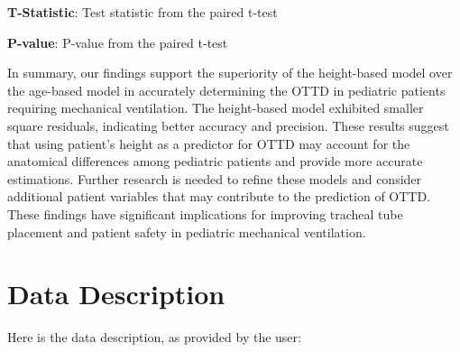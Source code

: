 \documentclass[11pt]{article}
\begin{document}
\begin{table}[h]
\caption{Paired t-test results for residuals of the Height and Age Models}
\label{table:t_test}
\begin{threeparttable}
\renewcommand{\TPTminimum}{\linewidth}
\begin{tablenotes}
\footnotesize
\item \textbf{T-Statistic}: Test statistic from the paired t-test
\item \textbf{P-value}: P-value from the paired t-test
\end{tablenotes}
\end{threeparttable}
\end{table}


In summary, our findings support the superiority of the height-based model over the age-based model in accurately determining the OTTD in pediatric patients requiring mechanical ventilation. The height-based model exhibited smaller square residuals, indicating better accuracy and precision. These results suggest that using patient's height as a predictor for OTTD may account for the anatomical differences among pediatric patients and provide more accurate estimations. Further research is needed to refine these models and consider additional patient variables that may contribute to the prediction of OTTD. These findings have significant implications for improving tracheal tube placement and patient safety in pediatric mechanical ventilation.


\clearpage
\appendix

\section{Data Description} \label{sec:data_description} Here is the data description, as provided by the user:
\end{document}
